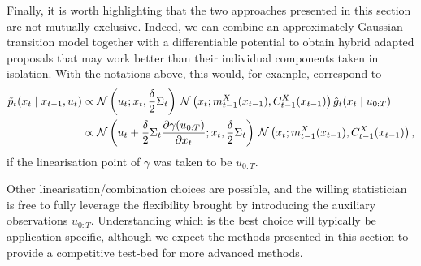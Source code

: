 Finally, it is worth highlighting that the two approaches presented in this section are not mutually exclusive. Indeed, we can combine an approximately Gaussian transition model together with a differentiable potential to obtain hybrid adapted proposals that may work better than their individual components taken in isolation. With the notations above, this would, for example, correspond to
\begin{equation}
    \label{eq:guided-prop-grad}
    \begin{split}
        \tilde{p}_t(x_t \mid x_{t-1}, u_t)
        &\propto \mathcal{N}\left(u_t; x_t, \frac{\delta}{2} \Sigma_t \right) \,\mathcal{N}\left(x_t; m^X_{t-1}(x_{t-1}), C^X_{t-1}(x_{t-1})\right) \hat{g}_t(x_t \mid u_{0:T})\\
        &\propto \mathcal{N}\left(u_t + \frac{\delta}{2}\Sigma_t \pdv{\gamma(u_{0:T})}{x_t}; x_t, \frac{\delta}{2} \Sigma_t \right) \,\mathcal{N}\left(x_t; m^X_{t-1}(x_{t-1}), C^X_{t-1}(x_{t-1})\right),
    \end{split}
\end{equation}
if the linearisation point of $\gamma$ was taken to be $u_{0:T}$.

Other linearisation/combination choices are possible, and the willing statistician is free to fully leverage the flexibility brought by introducing the auxiliary observations $u_{0:T}$. Understanding which is the best choice will typically be application specific, although we expect the methods presented in this section to provide a competitive test-bed for more advanced methods.
